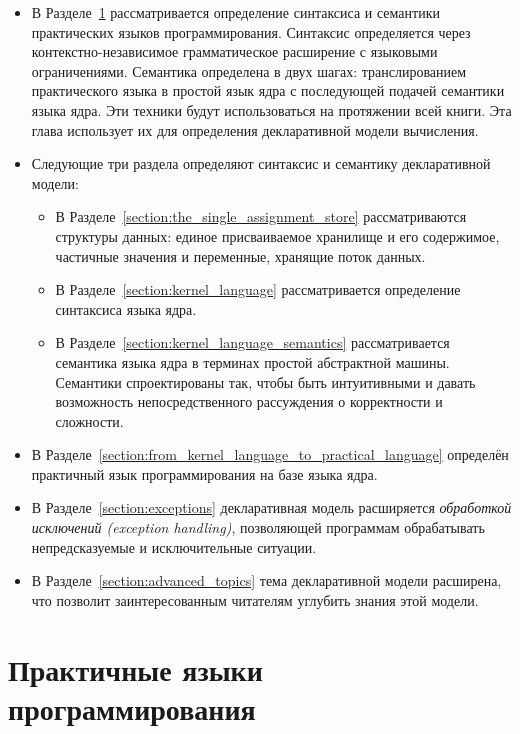 \begin{itemize}
\item{В Разделе~\ref{section:defining_practical_programming_languages} рассматривается определение синтаксиса и семантики практических языков программирования. Синтаксис определяется через контекстно-независимое грамматическое расширение с языковыми ограничениями. Семантика определена в двух шагах: транслированием практического языка в простой язык ядра с последующей подачей семантики языка ядра. Эти техники будут использоваться на протяжении всей книги. Эта глава использует их для определения декларативной модели вычисления.}

\item{Следующие три раздела определяют синтаксис и семантику декларативной модели:

  \begin{itemize}
\item{В Разделе~\ref{section:the_single_assignment_store} рассматриваются структуры данных: единое присваиваемое хранилище и его содержимое, частичные значения и переменные, хранящие поток данных.}

\item{В Разделе~\ref{section:kernel_language} рассматривается определение синтаксиса языка ядра.}

\item{В Разделе~\ref{section:kernel_language_semantics} рассматривается семантика языка ядра в терминах простой абстрактной машины. Семантики спроектированы так, чтобы быть интуитивными и давать возможность непосредственного рассуждения о корректности и сложности.}
  \end{itemize}
}

\item{В Разделе~\ref{section:from_kernel_language_to_practical_language} определён практичный язык программирования на базе языка ядра.}

\item{В Разделе~\ref{section:exceptions} декларативная модель расширяется \emph{обработкой исключений (exception handling)}, позволяющей программам обрабатывать непредсказуемые и исключительные ситуации.}

\item{В Разделе~\ref{section:advanced_topics} тема декларативной модели расширена, что позволит заинтересованным читателям углубить знания этой модели.}
\end{itemize}

\section{Практичные языки программирования}\label{section:defining_practical_programming_languages}

